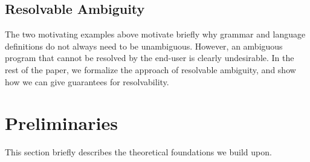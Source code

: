 \documentclass[acmsmall,review,anonymous]{acmart}\settopmatter{printfolios=true,printccs=false,printacmref=false}
\begin{document}



\subsection{Resolvable Ambiguity}
The two motivating examples above motivate briefly why grammar
and language definitions do not always need to be unambiguous. However, an
ambiguous program that cannot be resolved by the end-user is clearly
undesirable. In the rest of the paper, we formalize the approach of
resolvable ambiguity, and show how we can give guarantees for
resolvability.




\section{Preliminaries}
\label{sec:prel}

This section briefly describes the theoretical foundations we build upon.

\end{document}
